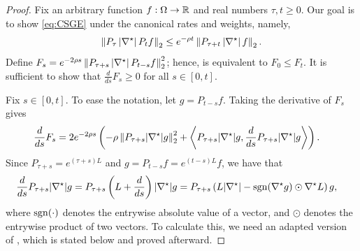 \begin{proof}
    Fix an arbitrary function $f: \Omega \to \mathbb{R}$ and real numbers $\tau, t \ge 0$.
    Our goal is to show \ref{eq:CSGE} under the canonical rates and weights, namely, 
    \begin{align}\label{eq:goal-CSGE}
        \left\lVert P_\tau \left\vert\nabla^\star\right\vert P_t f \right\rVert_2 \leq e^{-\rho t} \left\lVert P_{\tau+t} \left\vert\nabla^\star\right\vert f \right\rVert_2. 
    \end{align}
    Define $F_s = e^{-2\rho s} \left\lVert P_{\tau+s}\left\vert\nabla^\star\right\vert P_{t-s} f \right\rVert_2^2$; hence,  is equivalent to $F_0 \le F_t$.
    It is sufficient to show that $\frac d{ds} F_s \geq 0$ for all $s \in [0,t]$.
    
    Fix $s \in [0,t]$. To ease the notation, let $g = P_{t-s} f$.
    Taking the derivative of $F_s$ gives 
    \begin{align}
        \frac d{ds} F_s &= 2 e^{-2\rho s} \left( - \rho \left\lVert P_{\tau+s} |\nabla^\star| g \right\rVert_2^2 
        + \left\langle P_{\tau+s} |\nabla^\star| g,\frac{d}{ds} P_{\tau+s} |\nabla^\star| g\right\rangle
        \right).
        \label{eq:CSGE_potential_function_derivative}
    \end{align}
    Since $P_{\tau+s} = e^{(\tau+s)L}$ and $g = P_{t-s} f = e^{(t-s)L} f$, we have that
    \begin{align}
    \label{eq:derivative-CSGE}
        \frac d{ds} P_{\tau+s} |\nabla^\star| g
        &= P_{\tau+s} \left( L + \frac{d}{ds} \right) |\nabla^\star| g 
        = P_{\tau+s} \left( L |\nabla^\star| - \mathrm{sgn}(\nabla^\star g) \odot \nabla^\star L \right) g,
    \end{align}
    where $\mathrm{sgn}(\cdot)$ denotes the entrywise absolute value of a vector, and $\odot$ denotes the entrywise product of two vectors.
    To calculate this, we need an adapted version of , which is stated below and proved afterward.


\end{proof}

